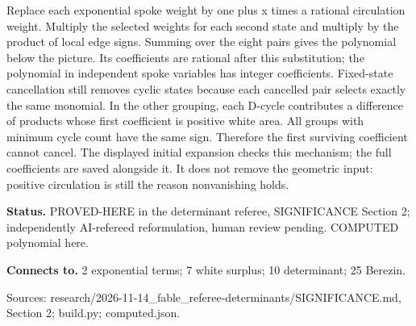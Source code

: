 Replace each exponential spoke weight by one plus x times a rational circulation weight. Multiply the selected weights for each second state and multiply by the product of local edge signs. Summing over the eight pairs gives the polynomial below the picture. Its coefficients are rational after this substitution; the polynomial in independent spoke variables has integer coefficients. Fixed-state cancellation still removes cyclic states because each cancelled pair selects exactly the same monomial. In the other grouping, each D-cycle contributes a difference of products whose first coefficient is positive white area. All groups with minimum cycle count have the same sign. Therefore the first surviving coefficient cannot cancel. The displayed initial expansion checks this mechanism; the full coefficients are saved alongside it. It does not remove the geometric input: positive circulation is still the reason nonvanishing holds.

\textbf{Status.} PROVED-HERE in the determinant referee, SIGNIFICANCE Section 2; independently AI-refereed reformulation, human review pending. COMPUTED polynomial here.

\textbf{Connects to.} 2 exponential terms; 7 white surplus; 10 determinant; 25 Berezin.

{\footnotesize\raggedright Sources: research/\allowbreak{}2026-11-14\_fable\_referee-determinants/\allowbreak{}SIGNIFICANCE.md, Section 2;\allowbreak{} build.py;\allowbreak{} computed.json.\par}
